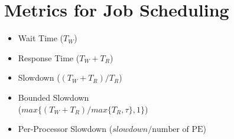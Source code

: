 \section{Metrics for Job Scheduling}

\begin{itemize}
  \item Wait Time (\(T_W\))
  \item Response Time (\(T_W + T_R\))
  \item Slowdown (\((T_W + T_R)/T_R\))
  \item Bounded Slowdown \\
  (\(max\{(T_W+ T_R) / max\{T_R,\tau\}, 1\}\))
  \item Per-Processor Slowdown (\(slowdown/ \text{number of PE}\))
\end{itemize}
